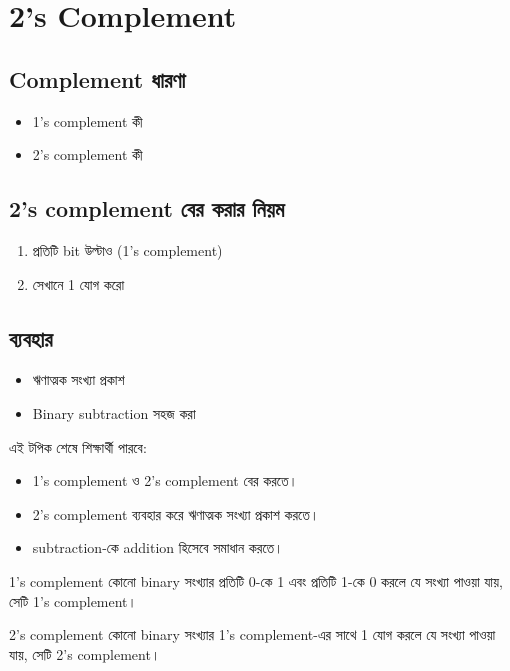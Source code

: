 \section{2's Complement}

\subsection{Complement ধারণা}
\begin{itemize}
\item 1's complement কী
\item 2's complement কী
\end{itemize}

\subsection{2's complement বের করার নিয়ম}
\begin{enumerate}
\item প্রতিটি bit উল্টাও (1's complement)
\item সেখানে 1 যোগ করো
\end{enumerate}

\subsection{ব্যবহার}
\begin{itemize}
\item ঋণাত্মক সংখ্যা প্রকাশ
\item Binary subtraction সহজ করা
\end{itemize}

\begin{learningbox}
এই টপিক শেষে শিক্ষার্থী পারবে:
\begin{itemize}
\item 1's complement ও 2's complement বের করতে।
\item 2's complement ব্যবহার করে ঋণাত্মক সংখ্যা প্রকাশ করতে।
\item subtraction-কে addition হিসেবে সমাধান করতে।
\end{itemize}
\end{learningbox}

\begin{definitionbox}{1's complement}
কোনো binary সংখ্যার প্রতিটি 0-কে 1 এবং প্রতিটি 1-কে 0 করলে যে সংখ্যা পাওয়া যায়, সেটি 1's complement।
\end{definitionbox}

\begin{definitionbox}{2's complement}
কোনো binary সংখ্যার 1's complement-এর সাথে 1 যোগ করলে যে সংখ্যা পাওয়া যায়, সেটি 2's complement।
\end{definitionbox}

